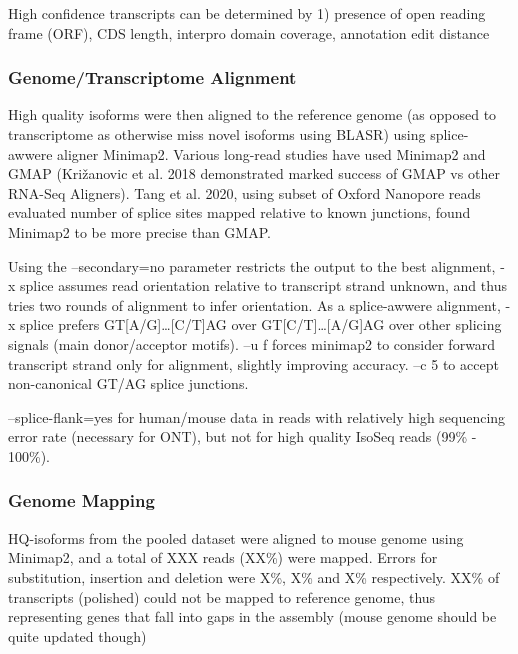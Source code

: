 High confidence transcripts can be determined by 1) presence of open reading frame (ORF), CDS length, interpro domain coverage, annotation edit distance 

\subsubsection{Genome/Transcriptome Alignment} 
High quality isoforms were then aligned to the reference genome (as opposed to transcriptome as otherwise miss novel isoforms using BLASR) using splice-awwere aligner Minimap2. Various long-read studies have used Minimap2 and GMAP (Križanovic et al. 2018 demonstrated marked success of GMAP vs other RNA-Seq Aligners). Tang et al. 2020, using subset of Oxford Nanopore reads evaluated number of splice sites mapped relative to known junctions, found Minimap2 to be more precise than GMAP. 

Using the –secondary=no parameter restricts the output to the best alignment, -x splice assumes read orientation relative to transcript strand unknown, and thus tries two rounds of alignment to infer orientation. As a splice-awwere alignment, -x splice prefers GT[A/G]…[C/T]AG over GT[C/T]…[A/G]AG over other splicing signals (main donor/acceptor motifs). –u f forces minimap2 to consider forward transcript strand only for alignment, slightly improving accuracy. –c 5 to accept non-canonical GT/AG splice junctions. 

--splice-flank=yes for human/mouse data in reads with relatively high sequencing error rate (necessary for ONT), but not for high quality IsoSeq reads (99\% - 100\%). 

\subsubsection{Genome Mapping}
HQ-isoforms from the pooled dataset were aligned to mouse genome using Minimap2, and a total of XXX reads (XX\%) were mapped. Errors for substitution, insertion and deletion were X\%, X\% and X\% respectively. XX\% of transcripts (polished) could not be mapped to reference genome, thus representing genes that fall into gaps in the assembly (mouse genome should be quite updated though)


